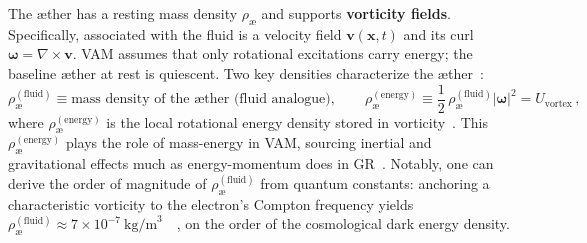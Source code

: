 \documentclass[a4paper,12pt]{article}
\begin{document}
    The æther has a resting mass density $\rho_{\text{\ae}}$ and supports \textbf{vorticity fields}. Specifically, associated with the fluid is a velocity field $\mathbf{v}(\mathbf{x},t)$ and its curl $\boldsymbol{\omega} = \nabla \times \mathbf{v}$. VAM assumes that only rotational excitations carry energy; the baseline æther at rest is quiescent. Two key densities characterize the æther~\cite{reference_17}:
    \begin{equation}
        \rho_{\text{\ae}}^{(\text{fluid})} \equiv \text{mass density of the æther (fluid analogue)}, \qquad
        \rho_{\text{\ae}}^{(\text{energy})} \equiv \frac{1}{2}\,\rho_{\text{\ae}}^{(\text{fluid})} |\boldsymbol{\omega}|^2 = U_{\text{vortex}}\,,
        \label{eq:aether-densities}
    \end{equation}
    where $\rho_{\text{\ae}}^{(\text{energy})}$ is the local rotational energy density stored in vorticity~\cite{reference_18}. This $\rho_{\text{\ae}}^{(\text{energy})}$ plays the role of mass-energy in VAM, sourcing inertial and gravitational effects much as energy-momentum does in GR~\cite{reference_19}. Notably, one can derive the order of magnitude of $\rho_{\text{\ae}}^{(\text{fluid})}$ from quantum constants: anchoring a characteristic vorticity to the electron’s Compton frequency yields $\rho_{\text{\ae}}^{(\text{fluid})} \approx 7\times 10^{-7}~\text{kg/m}^3$~\cite{reference_20}~\cite{reference_21}, on the order of the cosmological dark energy density.
\end{document}
